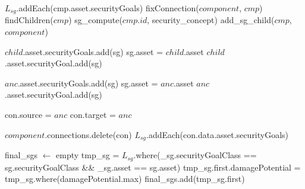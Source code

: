\begin{algorithm}[H] 
\begin{algorithmic}

\State $L_{sg}$.addEach(cmp.asset.securityGoals)
\EndIf
\State fixConnection($component$, $cmp$)
\State findChildren($cmp$)
\EndFor
\Else
{}
\State sg\_compute($cmp.id$, security\_concept)
\State add\_sg\_child($cmp$, $component$)
\EndFor
\EndIf
\EndFunction

 
\State $child$.asset.securityGoals.add(sg)
\State sg.asset = $child$.asset
\State $child$.asset.securityGoal.add(sg)
\EndIf
\EndFor
\EndFunction

 
\State $anc$.asset.securityGoals.add(sg)
\State sg.asset = $anc$.asset
\State $anc$.asset.securityGoal.add(sg)
\EndIf
\EndFor
\EndFunction

\end{algorithmic}
\end{algorithm}

\begin{algorithm}[H] 
\begin{algorithmic}

\State con.source = $anc$
\State con.target = $anc$
\EndIf
\EndFor
\EndFunction

\State $component$.connections.delete(con)
\State $L_{sg}$.addEach(con.data.asset.securityGoals)
\EndIf
\EndFor
\EndFunction

\State final\_sgs $\gets$ empty
\State tmp\_sg = $L_{sg}$.where(\_sg.securityGoalClass == sg.securityGoalClass  \&\& \_sg.asset == sg.asset)
\State tmp\_sg.first.damagePotential = tmp\_sg.where(damagePotential.max)
\State final\_sgs.add(tmp\_sg.first)
\EndFor
\EndFunction
\end{algorithmic}
\end{algorithm}

